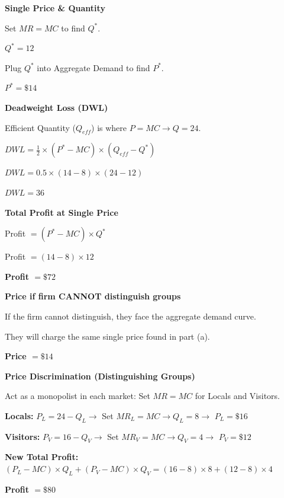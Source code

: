 \documentclass[12pt]{article}
\begin{document}
\begin{subqs}

\item \textbf{Single Price \& Quantity}
  \begin{solbullets}
    \item Set $MR = MC$ to find $Q^*$.
    \item \textbf{$Q^* = 12$}
    \item Plug $Q^*$ into Aggregate Demand to find $P^*$.
    \item \textbf{$P^* = \$14$}
  \end{solbullets}

\item \textbf{Deadweight Loss (DWL)}
  \begin{solbullets}
    \item Efficient Quantity ($Q_{eff}$) is where $P = MC \rightarrow Q = 24$.
    \item $DWL = \frac{1}{2} \times (P^* - MC) \times (Q_{eff} - Q^*)$
    \item $DWL = 0.5 \times (14 - 8) \times (24 - 12)$
    \item \textbf{$DWL = 36$}
  \end{solbullets}

\item \textbf{Total Profit at Single Price}
  \begin{solbullets}
    \item Profit $= (P^* - MC) \times Q^*$
    \item Profit $= (14 - 8) \times 12$
    \item \textbf{Profit $= \$72$}
  \end{solbullets}

\item \textbf{Price if firm CANNOT distinguish groups}
  \begin{solbullets}
    \item If the firm cannot distinguish, they face the aggregate demand curve.
    \item They will charge the same single price found in part (a).
    \item \textbf{Price $= \$14$}
  \end{solbullets}

\item \textbf{Price Discrimination (Distinguishing Groups)}
  \begin{solbullets}
    \item Act as a monopolist in each market: Set $MR = MC$ for Locals and Visitors.
    \item \textbf{Locals:} $P_L = 24 - Q_L \rightarrow$ Set $MR_L = MC \rightarrow Q_L = 8 \rightarrow$ \textbf{$P_L = \$16$}
    \item \textbf{Visitors:} $P_V = 16 - Q_V \rightarrow$ Set $MR_V = MC \rightarrow Q_V = 4 \rightarrow$ \textbf{$P_V = \$12$}
    \item \textbf{New Total Profit:} $(P_L - MC) \times Q_L + (P_V - MC) \times Q_V = (16 - 8) \times 8 + (12 - 8) \times 4$
    \item \textbf{Profit $= \$80$}
  \end{solbullets}


\end{subqs}
\end{document}
